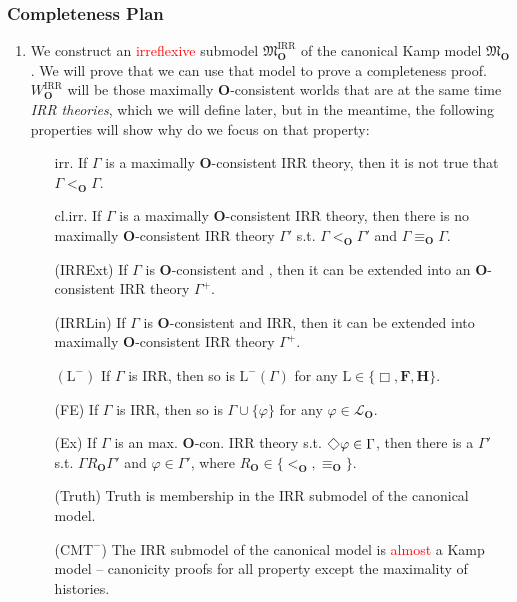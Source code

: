 \documentclass[xcolor=x11names]{beamer}
\newcommand{\bemph}[1] {{\color{DeepSkyBlue3}{#1}}}
\newcommand{\cemph}[1]{\textcolor{red}{#1}}
\newcommand{\FD}{\mathbf F}
\newcommand{\PB}{\mathbf H}
\renewcommand{\Diamond}{\scalebox{.9}{\raisebox{-.4ex}{\rotatebox{45}{$\Box$}}}}
\begin{document}
\begin{frame}[t]
	\frametitle{Completeness Plan}
\tiny
\begin{enumerate}\tiny
\item  We construct an \cemph{irreflexive} submodel $\mathfrak M_{\mathbf O}^{\mathrm{IRR}}$ of the canonical Kamp model $\mathfrak M_{\mathbf O}$. We will prove that we can use that model to prove a completeness proof. $W_{\mathbf O}^{\mathrm{IRR}}$ will be those maximally $\mathbf O$-consistent worlds that are at the same time \emph{IRR theories}, which we will define later, but in the meantime, the following properties will show why do we focus on that property:
\begin{enumerate}\tiny
\item[irr.] If $\Gamma$ is a maximally ${\mathbf{O}}$-consistent IRR theory, then it is not true that $\Gamma <_\mathbf{O}\Gamma$.
\item[cl.irr.] If $\Gamma$ is a maximally ${\mathbf{O}}$-consistent IRR theory, then there is no maximally ${\mathbf{O}}$-consistent IRR theory $\Gamma'$ s.t. $\Gamma <_\mathbf{O}\Gamma'$ and $\Gamma \equiv_\mathbf{O}\Gamma$.
\item[(IRRExt)] If $\Gamma$ is ${\mathbf{O}}$-consistent and \bemph{an infinite number of atomic sentences does not occur in $\Gamma$}, then it can be extended into an ${\mathbf{O}}$-consistent IRR theory $\Gamma^+$.
\item[(IRRLin)] If $\Gamma$ is ${\mathbf{O}}$-consistent and IRR, then it can be extended into maximally ${\mathbf{O}}$-consistent IRR theory $\Gamma^+$.
\item[$(\mathrm L^-)$] If $\Gamma$ is IRR, then so is $\mathrm{L}^-(\Gamma)$ for any $\mathrm{L}\in \{\Box , \FD, \PB\}$.
\item[(FE)] If $\Gamma$ is IRR, then so is $\Gamma\cup \{\varphi\}$ for any $\varphi\in \mathcal L_{\mathbf {O}}$.
\item[(Ex)] If $\Gamma$ is an max. ${\mathbf{O}}$-con. IRR theory s.t. $\Diamond \varphi \in \Gamma$, then there is a $\Gamma'$ s.t. $\Gamma R_{\mathbf O} \Gamma'$ and $\varphi \in \Gamma'$, where $R_{\mathbf{O}}\in \{<_\mathbf O, \equiv_{\mathbf O} \}$.
\item[(Truth)] Truth is membership in the IRR submodel of the canonical model.
\item[($\mathrm{CMT}^-$)] The IRR submodel of the canonical model is \cemph{almost} a Kamp model -- canonicity proofs for all property except the maximality of histories.
\end{enumerate}

\end{enumerate}
\end{frame}
\end{document}

